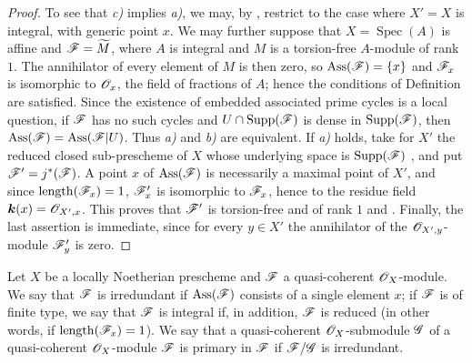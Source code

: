 \begin{proof}
To see that \emph{c)} implies \emph{a)}, we may, by , restrict to the case where $X'=X$ is integral, with generic point $x$.  We may further suppose that $X=\operatorname{Spec}(A)$ is affine and $\mathscr{F}=\widetilde{M}$, where $A$ is integral and $M$ is a torsion-free $A$-module of rank $1$.  The annihilator of every element of $M$ is then zero, so $\operatorname{Ass}(\mathscr{F})=\{x\}$ and $\mathscr{F}_x$ is isomorphic to $\mathscr{O}_x$, the field of fractions of $A$; hence the conditions of Definition  are satisfied.
Since the existence of embedded associated prime cycles is a local question, if $\mathscr{F}$ has no such cycles and $U\cap\operatorname{Supp}(\mathscr{F})$ is dense in $\operatorname{Supp}(\mathscr{F})$, then $\operatorname{Ass}(\mathscr{F})=\operatorname{Ass}(\mathscr{F}|U)$.  Thus \emph{a)} and \emph{b)} are equivalent.
If \emph{a)} holds, take for $X'$ the reduced closed sub-prescheme of $X$ whose underlying space is $\operatorname{Supp}(\mathscr{F})$ , and put $\mathscr{F}'=j^*(\mathscr{F})$.  A point $x$ of $\operatorname{Ass}(\mathscr{F})$ is necessarily a maximal point of $X'$, and since $\operatorname{length}(\mathscr{F}_x)=1$, $\mathscr{F}'_x$ is isomorphic to $\mathscr{F}_x$, hence to the residue field $\boldsymbol{k}(x)=\mathscr{O}_{X',x}$.  This proves that $\mathscr{F}'$ is torsion-free and of rank $1$  and .
Finally, the last assertion is immediate, since for every $y\in X'$ the annihilator of the $\mathscr{O}_{X',y}$-module $\mathscr{F}'_y$ is zero.
\end{proof}

\begin{definition}[3.2.4]
\label{IV.3.2.4}
Let $X$ be a locally Noetherian prescheme and $\mathscr{F}$ a quasi-coherent $\mathscr{O}_X$-module.
We say that $\mathscr{F}$ is irredundant if $\operatorname{Ass}(\mathscr{F})$ consists of a single element $x$; if $\mathscr{F}$ is of finite type, we say that $\mathscr{F}$ is integral if, in addition, $\mathscr{F}$ is reduced \textup{(in other words, if $\operatorname{length}(\mathscr{F}_x)=1$)}.
We say that a quasi-coherent $\mathscr{O}_X$-submodule $\mathscr{G}$ of a quasi-coherent $\mathscr{O}_X$-module $\mathscr{F}$ is primary in $\mathscr{F}$ if $\mathscr{F}/\mathscr{G}$ is irredundant.
\end{definition}

